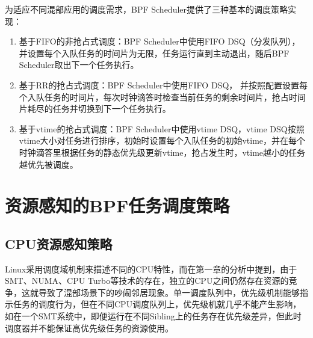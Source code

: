 
为适应不同混部应用的调度需求，BPF Scheduler提供了三种基本的调度策略实现：

\begin{enumerate}
    \item 基于FIFO的非抢占式调度：BPF Scheduler中使用FIFO DSQ（分发队列），并设置每个入队任务的时间片为无限，任务运行直到主动退出，随后BPF Scheduler取出下一个任务执行。
    \item 基于RR的抢占式调度：BPF Scheduler中使用FIFO DSQ， 并按照配置设置每个入队任务的时间片，每次时钟滴答时检查当前任务的剩余时间片，抢占时间片耗尽的任务并切换到下一个任务执行。
    \item 基于vtime的抢占式调度：BPF Scheduler中使用vtime DSQ，vtime DSQ按照vtime大小对任务进行排序，初始时设置每个入队任务的初始vtime，并在每个时钟滴答里根据任务的静态优先级更新vtime，抢占发生时，vtime越小的任务越优先被调度。
\end{enumerate}

\section{资源感知的BPF任务调度策略}



\subsection{CPU资源感知策略} 


Linux采用调度域机制来描述不同的CPU特性，而在第一章的分析中提到，由于SMT、NUMA、CPU Turbo等技术的存在，独立的CPU之间仍然存在资源的竞争，这就导致了混部场景下的吵闹邻居现象。单一调度队列中，优先级机制能够指示任务的调度行为，但在不同CPU调度队列上，优先级机就几乎不能产生影响，如在一个SMT系统中，即便运行在不同Sibling上的任务存在优先级差异，但此时调度器并不能保证高优先级任务的资源使用。

